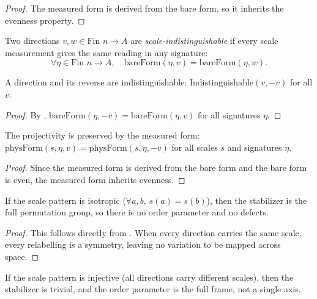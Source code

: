 \begin{proof}
The measured form is derived from the bare form, so it inherits the evenness property.
\end{proof}

\begin{definition}
Two directions $v, w \in \text{Fin } n \to A$ are \emph{scale-indistinguishable} if every scale measurement gives the same reading in any signature:
\[ \forall \eta \in \text{Fin } n \to A, \quad \mathrm{bareForm}(\eta, v) = \mathrm{bareForm}(\eta, w). \]
\end{definition}

\begin{theorem}
A direction and its reverse are indistinguishable: $\mathrm{Indistinguishable}(v, -v)$ for all $v$.
\end{theorem}

\begin{proof}
By , $\mathrm{bareForm}(\eta, -v) = \mathrm{bareForm}(\eta, v)$ for all signatures $\eta$.
\end{proof}

\begin{theorem}
The projectivity is preserved by the measured form: $\mathrm{physForm}(s, \eta, v) = \mathrm{physForm}(s, \eta, -v)$ for all scales $s$ and signatures $\eta$.
\end{theorem}

\begin{proof}
Since the measured form is derived from the bare form and the bare form is even, the measured form inherits evenness.
\end{proof}

\begin{theorem}
If the scale pattern is isotropic ($\forall a, b, \, s(a) = s(b)$), then the stabilizer is the full permutation group, so there is no order parameter and no defects.
\end{theorem}

\begin{proof}
This follows directly from . When every direction carries the same scale, every relabelling is a symmetry, leaving no variation to be mapped across space.
\end{proof}

\begin{theorem}
If the scale pattern is injective (all directions carry different scales), then the stabilizer is trivial, and the order parameter is the full frame, not a single axis.
\end{theorem}

